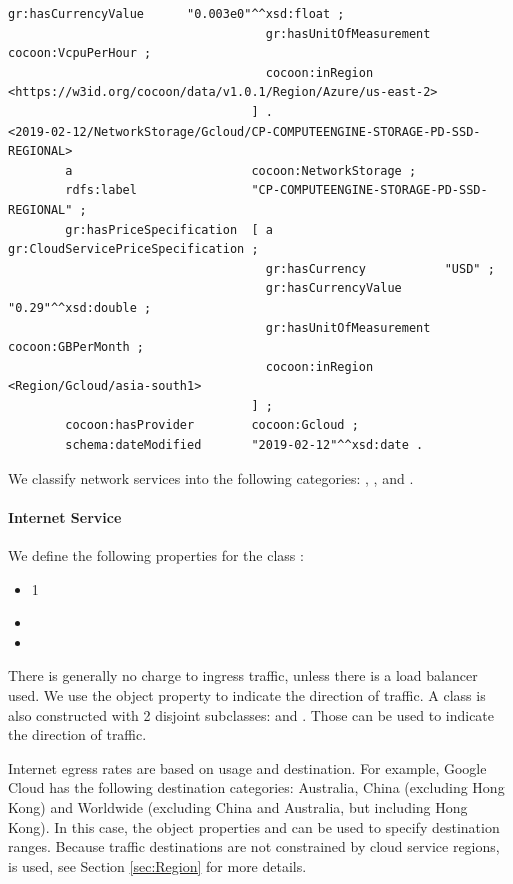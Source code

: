 \begin{lstlisting}[caption={Storage},label={lst:Storage}]
                                    gr:hasCurrencyValue      "0.003e0"^^xsd:float ;
                                    gr:hasUnitOfMeasurement  cocoon:VcpuPerHour ;
                                    cocoon:inRegion         <https://w3id.org/cocoon/data/v1.0.1/Region/Azure/us-east-2>
                                  ] .
<2019-02-12/NetworkStorage/Gcloud/CP-COMPUTEENGINE-STORAGE-PD-SSD-REGIONAL>
        a                         cocoon:NetworkStorage ;
        rdfs:label                "CP-COMPUTEENGINE-STORAGE-PD-SSD-REGIONAL" ;
        gr:hasPriceSpecification  [ a                        gr:CloudServicePriceSpecification ;
                                    gr:hasCurrency           "USD" ;
                                    gr:hasCurrencyValue      "0.29"^^xsd:double ;
                                    gr:hasUnitOfMeasurement  cocoon:GBPerMonth ;
                                    cocoon:inRegion         <Region/Gcloud/asia-south1>
                                  ] ;
        cocoon:hasProvider        cocoon:Gcloud ;
        schema:dateModified       "2019-02-12"^^xsd:date .
\end{lstlisting}

\label{sec:Network}
We classify network services into the following categories:
, ,  and .

\paragraph{Internet Service}
\label{sec:Internet}
We define the following properties for the class :
\begin{itemize}
  \item[]   1 
  \item[]   
  \item[]   
\end{itemize}
There is generally no charge to ingress traffic,
unless there is a load balancer used.
We use the  object property to indicate the direction of traffic.
A class  is also constructed with 2 disjoint subclasses:
 and . Those can be used to indicate the direction of traffic.

Internet egress rates are based on usage and destination.
For example, Google Cloud has the following destination categories:
Australia, China (excluding Hong Kong) and
Worldwide (excluding China and Australia, but including Hong Kong).
In this case, the object properties  and  can be used to specify destination ranges.
Because traffic destinations are not constrained by cloud service regions,
 is used, see Section \ref{sec:Region} for more details.

